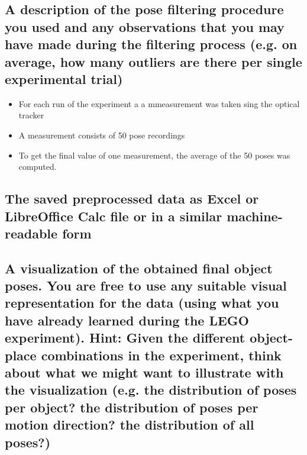\subsection{A description of the pose filtering procedure you used and any observations that you may have made during the filtering process (e.g. on average, how many outliers are there per single experimental trial)}

\begin{itemize}
	\item For each run of the experiment a a mmeasurement was taken sing the optical tracker
	\item A measurement consists of 50 pose recordings
	\item To get the final value of one measurement, the average of the 50 poses was computed.
	
\end{itemize}


\subsection{The saved preprocessed data as Excel or LibreOffice Calc file or in a similar machine-readable form}



\subsection{A visualization of the obtained final object poses. You are free to use any suitable visual representation for the data (using what you have already learned during the LEGO experiment). Hint: Given the different object-place combinations in the experiment, think about what we might want to illustrate with the visualization (e.g. the distribution of poses per object? the distribution of poses per motion direction? the distribution of all poses?)}


